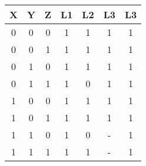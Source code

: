 \begin{tabular}{|c|c|c|c|c|c|c|}
        \hline X & Y & Z & L1 & L2 & L3 & L3 \\
        \hline 0 & 0 & 0 & 1 & 1 & 1 & 1 \\
        \hline 0 & 0 & 1 & 1 & 1 & 1 & 1 \\
        \hline 0 & 1 & 0 & 1 & 1 & 1 & 1 \\
        \hline 0 & 1 & 1 & 1 & 0 & 1 & 1 \\
 \hline 1 & 0 & 0 & 1 & 1 & 1 & 1 \\
 \hline 1 & 0 & 1 & 1 & 1 & 1 & 1 \\
 \hline 1 & 1 & 0 & 1 & 0 & - & 1 \\
 \hline 1 & 1 & 1 & 1 & 1 & - & 1 \\
 \hline
        \end{tabular}
